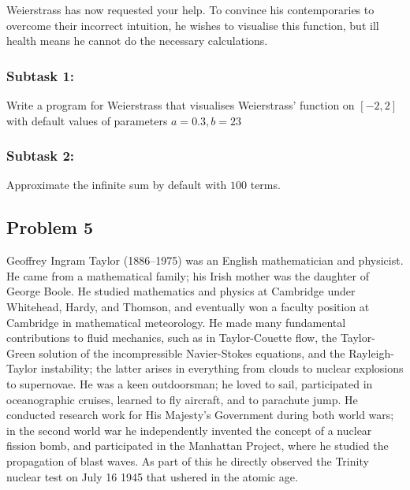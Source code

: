 \documentclass[12pt]{article}
\begin{document}
\vspace{1em}

Weierstrass has now requested your help. To convince his contemporaries to overcome their incorrect intuition, he wishes to visualise this function, but ill health means he cannot do the necessary calculations. 

\subsubsection*{\textbf{Subtask 1:}} 
    
    Write a program for Weierstrass that visualises Weierstrass' function on $[-2,2]$ with default values of parameters $a = 0.3, b = 23$
    
\subsubsection*{\textbf{Subtask 2:}} 
    Approximate the infinite sum by default with $100$ terms.

\newpage
\subsection{Problem 5}
Geoffrey Ingram Taylor (1886--1975) was an English mathematician and physicist. He came from a mathematical family; his Irish mother was the daughter of George Boole. He studied mathematics and physics at Cambridge under Whitehead, Hardy, and Thomson, and eventually won a faculty position at Cambridge in mathematical meteorology. He made many fundamental contributions to fluid mechanics, such as in Taylor-Couette flow, the Taylor-Green solution of the incompressible Navier-Stokes equations, and the Rayleigh-Taylor instability; the latter arises in everything from clouds to nuclear explosions to supernovae. He was a keen outdoorsman; he loved to sail, participated in oceanographic cruises, learned to fly aircraft, and to parachute jump. He conducted research work for His Majesty's Government during both world wars; in the second world war he independently invented the concept of a nuclear fission bomb, and participated in the Manhattan Project, where he studied the propagation of blast waves. As part of this he directly observed the Trinity nuclear test on July 16 1945 that ushered in the atomic age.

\vspace{1em}
\end{document}
